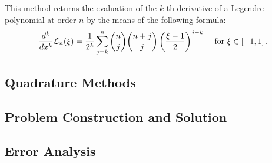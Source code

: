 This method returns the evaluation of the $k$-th derivative of a Legendre polynomial at order $n$ by the means of the following formula:
\begin{align}
    \frac{d^k}{dx^k} \mathcal{L}_n(\xi) &= \frac{1}{2^k} \sum_{j = k}^{n} \binom{n}{j} \binom{n + j}{j} \left( \frac{\xi - 1}{2} \right)^{j - k} &\text{ for } \xi \in \left[ -1, 1 \right].
\end{align}

\newpage
\subsection{Quadrature Methods}



\newpage
\subsection{Problem Construction and Solution}



\newpage
\subsection{Error Analysis}